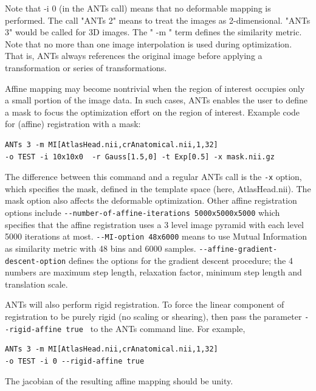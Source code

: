 \documentclass{InsightArticle}
\begin{document}
Note that -i 0 (in the ANTs call) means that no deformable mapping is performed. The call "ANTs 2" means to treat the images as 2-dimensional. "ANTs 3" would be called for 3D images. The " -m " term defines the similarity metric. 
Note that no more than one image interpolation is used during optimization.  
That is, ANTs always references the original image before applying a transformation or series of transformations. 

Affine mapping may become nontrivial when the region of interest 
occupies only a small portion of the image data.  In such cases, 
ANTs enables the user to define a mask to focus the optimization 
effort on the region of interest.  
Example code for (affine) registration with a mask: 
\begin{verbatim}
ANTs 3 -m MI[AtlasHead.nii,crAnatomical.nii,1,32] 
-o TEST -i 10x10x0  -r Gauss[1.5,0] -t Exp[0.5] -x mask.nii.gz
\end{verbatim}
The difference between this command 
and a regular ANTs call is the \verb"-x" option, which specifies the mask, defined in the 
template space (here, AtlasHead.nii).   The mask option also affects the deformable optimization. 
Other affine registration options include  \verb"--number-of-affine-iterations 5000x5000x5000" which specifies that the affine registration uses a 3 level image pyramid with each level 5000 iterations at most. \verb"--MI-option 48x6000" means to use Mutual Information as similarity metric with 48 bins and 6000 samples. \verb"--affine-gradient-descent-option" defines the options for the gradient descent procedure; the 4 numbers are maximum step length, relaxation factor, minimum step length and translation scale.  


  ANTs will also perform rigid registration.  
To force the linear component of registration to be purely rigid (no scaling or shearing), 
then pass the parameter  \verb"--rigid-affine true " to 
the ANTs command line.   For example,  
\begin{verbatim}
ANTs 3 -m MI[AtlasHead.nii,crAnatomical.nii,1,32] 
-o TEST -i 0 --rigid-affine true 
\end{verbatim}
The jacobian of the resulting affine mapping should be unity. 
\end{document}
